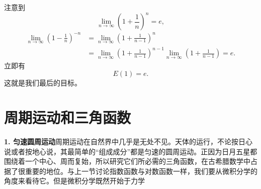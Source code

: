 注意到
\[
\lim_{n\to\infty}\left(1+\frac1n\right)^n=e,
\]
\[
\begin{aligned}
\lim_{n\to\infty}\left(1-\frac1n\right)^{-n}
&=\lim_{n\to\infty}\left(1+\frac1{n-1}\right)^n\\
&=\lim_{n\to\infty}\left(1+\frac1{n-1}\right)^{n-1}
  \lim_{n\to\infty}\left(1+\frac1{n-1}\right)=e.
\end{aligned}
\]
立即有
\[
E(1)=e. \tag{22}
\]
这就是我们最后的目标。

\section{周期运动和三角函数}

\textbf{1. 匀速圆周运动}\quad 周期运动在自然界中几乎是无处不见。天体的运行，不论按日心说或者按地心说，其最简单的“组成成分”都是匀速的圆周运动。正因为日月五星都围绕着一个中心、周而复始，所以研究它们所必需的三角函数，在古希腊数学中占据了很重要的地位。与上一节讨论指数函数与对数函数一样，我们要从微积分学的角度来看待它。但是微积分学既然开始于力学
